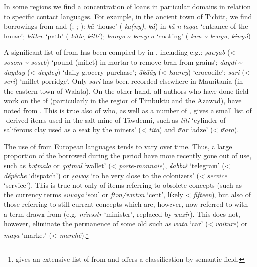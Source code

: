 \documentclass[output=paper]{langsci/langscibook}
\begin{document}
In some regions we find a concentration of loans in particular domains in relation to specific contact languages. For example, in the ancient town of Tichitt, we find borrowings from  and  (\citealt{Jacques-Meunié1961}; \citealt{Monteil1939}; \citealt{Diagana2013}): \textit{kā} ‘house’ ( \textit{ka(ny)},  \textit{ká}) in \textit{kā} \textit{n} \textit{laqqe} ‘entrance of the house’; \textit{killen} ‘path’ ( \textit{kille},  \textit{kìllé}); \textit{kunyu} \~{} \textit{kenyen} ‘cooking’ ( \textit{knu} \~{} \textit{kenyu},  \textit{kìnŋú}).

A significant list of  from  has been compiled by \citet{Heath2004} in , including e.g.: \textit{ṣawṣab} (< \textit{sosom} \~{} \textit{sosob}) ‘pound (millet) in mortar to remove bran from grains’; \textit{daydi} \~{} \textit{dayday} (< \textit{deydey}) ‘daily grocery purchase’; \textit{ākā{\R}āy} (< \textit{kaarey}) ‘crocodile’; \textit{sari} (< \textit{seri}) ‘millet porridge’. Only \textit{sari} has been recorded elsewhere in Mauritania (in the eastern town of Walata). On the other hand, all authors who have done field work on the  of  (particularly in the region of Timbuktu and the Azawad), have noted  from . This is true also of \citet{Clauzel1960} who, as well as a number of  , gives a small list of -derived items used in the salt mine of Tāwdenni, such as \textit{titi} ‘cylinder of saliferous clay used as a seat by the miners’ (< \textit{tita}) and \textit{tʸar} ‘adze’ (< \textit{tʸara}).


The use of  from European languages tends to vary over time. Thus, a large proportion of the   borrowed during the  period have more recently gone out of use, such as \textit{bə{\R}ṭmāla} or \textit{qo{\R}ṭmāl} ‘wallet’ (< \textit{porte-monnaie}), \textit{dabbīš} ‘telegram’ (< \textit{dépêche} ‘dispatch’) or \textit{ṣa{\R}waṣ} ‘to be very close to the colonizers’ (\textit{<} \textit{service} ‘service’). This is true not only of items referring to obsolete concepts (such as the currency terms \textit{sūvāya} ‘sou’ or \textit{ftən/vəvtən} ‘cent’, likely < \textit{fifteen}), but also of those referring to still-current concepts which are, however, now referred to with a term drawn from   (e.g. \textit{minəstr} ‘minister’, replaced by \textit{wazīr}). This does not, however, eliminate the permanence of some old  such as \textit{wata} ‘car’ (< \textit{voiture}) or \textit{ma{\R}ṣa} ‘market’ (< \textit{marché}).\footnote{\citet{OuldMohamedBaba2003} gives an extensive list of  from  and offers a classification by semantic field.}
\end{document}
